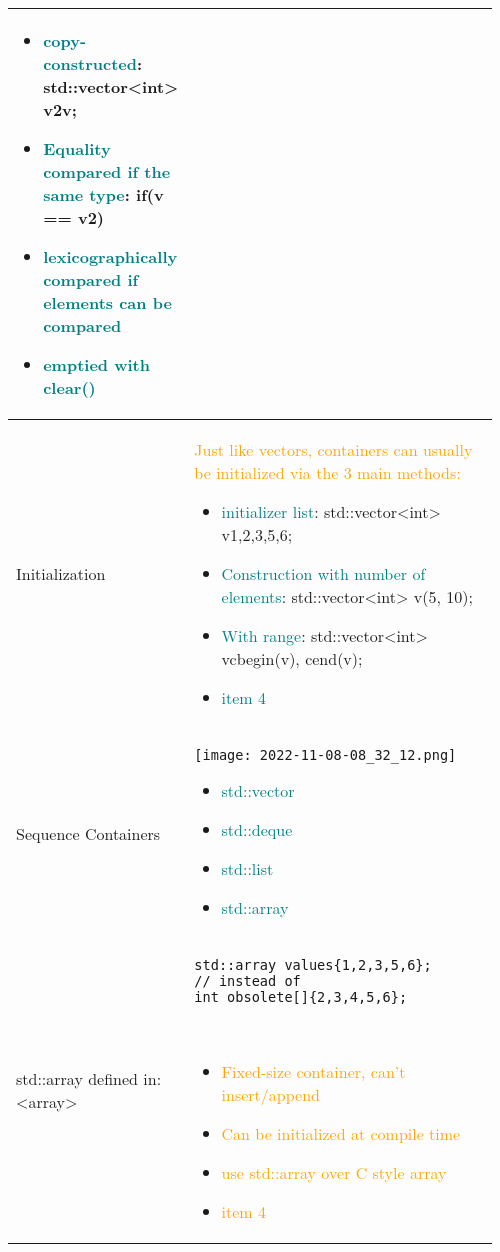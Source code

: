 \documentclass[main.tex,fontsize=8pt,paper=a4,paper=portrait,DIV=calc,]{scrartcl}
\begin{document}
\begin{table}[ht!]
\begin{tabular}{|m{0.2\linewidth}|m{0.755\linewidth}|}
\begin{itemize}
  \item \textcolor{teal}{copy-constructed}: std::vector<int> v2{v};
\item \textcolor{teal}{Equality compared if the same type}: if(v == v2)
\item \textcolor{teal}{lexicographically compared if elements can be compared}
\item \textcolor{teal}{emptied with clear()}
\vspace{-2mm}
\end{itemize}\\
\hline
Initialization & 
\textcolor{orange}{Just like vectors, containers can usually be initialized via the 3 main methods: }\newline
\begin{itemize}
  \item \textcolor{teal}{initializer list}: std::vector<int> v{1,2,3,5,6};
  \item \textcolor{teal}{Construction with number of elements}: std::vector<int> v(5, 10);
  \item \textcolor{teal}{With range}: std::vector<int> v{cbegin(v), cend(v)};
\item \textcolor{teal}{item 4}
\vspace{-2mm}
\end{itemize}\\
\hline
Sequence Containers & 
\vspace{2mm}
\texttt{[image: 2022-11-08-08\_32\_12.png]}\newline
\begin{itemize}
\item \textcolor{teal}{std::vector}
\item \textcolor{teal}{std::deque}
\item \textcolor{teal}{std::list}
\item \textcolor{teal}{std::array}
\vspace{-2mm}
\end{itemize}\\
\hline
std::array \newline
defined in: <array> &
\vspace{2mm}
\begin{lstlisting}
std::array values{1,2,3,5,6};
// instead of
int obsolete[]{2,3,4,5,6};
\end{lstlisting}
\, \newline
\begin{itemize}
\item \textcolor{orange}{Fixed-size container, can't insert/append}
\item \textcolor{orange}{Can be initialized at compile time}
\item \textcolor{orange}{use std::array over C style array}
\item \textcolor{orange}{item 4}
\vspace{-2mm}
\end{itemize}\\ 
\hline
\end{tabular}
\end{table}
\end{document}
